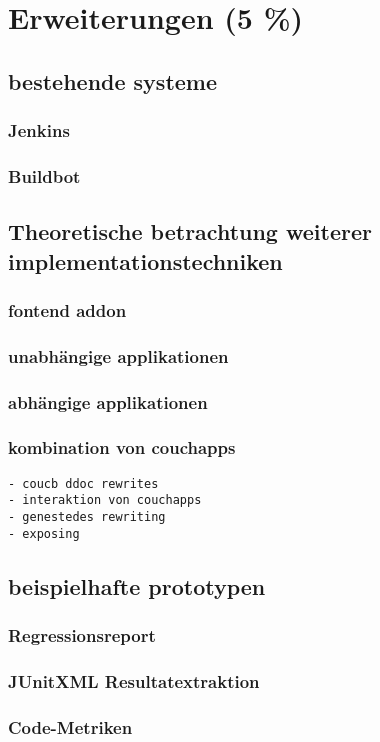 \chapter{Erweiterungen (5 \%)}


\section{bestehende systeme}
\subsection{Jenkins}
\subsection{Buildbot}


\section{Theoretische betrachtung weiterer implementationstechniken}
\subsection{fontend addon}
\subsection{unabh\"angige applikationen}
\subsection{abh\"angige applikationen}
\subsection{kombination von couchapps}

\begin{verbatim}
- coucb ddoc rewrites
- interaktion von couchapps
- genestedes rewriting
- exposing
\end{verbatim}


\section{beispielhafte prototypen}
\subsection{Regressionsreport}
\subsection{JUnitXML Resultatextraktion}
\subsection{Code-Metriken}

